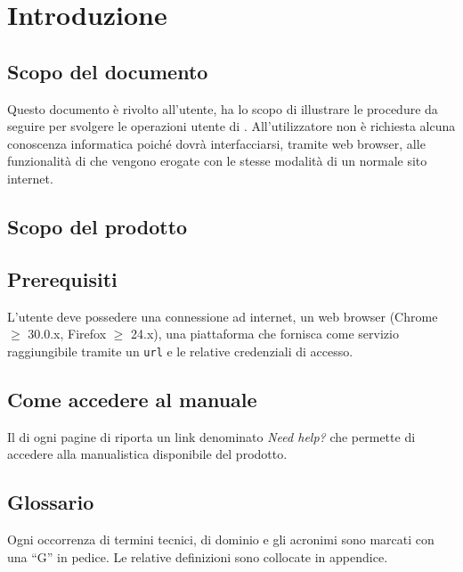\section{Introduzione}


	\subsection{Scopo del documento}
	Questo documento è rivolto all'utente, ha lo scopo di illustrare le procedure da seguire per svolgere le operazioni utente di . All'utilizzatore non è richiesta alcuna conoscenza informatica poiché dovrà interfacciarsi, tramite web browser, alle funzionalità di  che vengono erogate con le stesse modalità di un normale sito internet.

	\subsection{Scopo del prodotto}
	\ScopoDelProdotto{}

	\subsection{Prerequisiti}
	L'utente deve possedere una connessione ad internet, un web browser (Chrome $\geq$ 30.0.x, Firefox $\geq$ 24.x), una piattaforma che fornisca  come servizio raggiungibile tramite un \texttt{url} e le relative credenziali di accesso.

	\subsection{Come accedere al manuale}
	Il  di ogni pagine di  riporta un link denominato \emph{Need help?} che permette di accedere alla manualistica disponibile del prodotto.
	


	\subsection{Glossario}
	Ogni occorrenza di termini tecnici, di dominio e gli acronimi sono marcati con una ``G'' in pedice. Le relative definizioni sono collocate in appendice.




